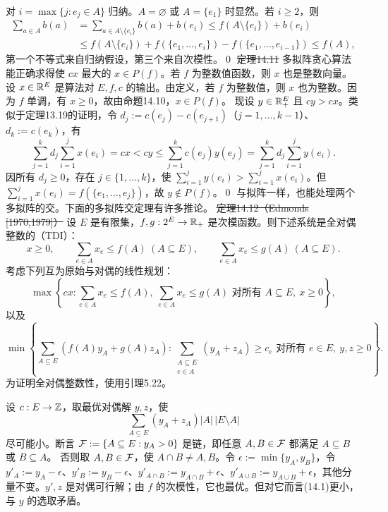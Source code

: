 \pr 对 $i=\max\{j:e_j\in A\}$ 归纳。$A=\varnothing$ 或 $A=\{e_1\}$ 时显然。若 $i\ge2$，则
\begin{align*}
\sum_{a\in A}b(a)&=\sum_{a\in A\setminus\{e_i\}}b(a)+b(e_i)\le f(A\setminus\{e_i\})+b(e_i)\\
&\le f(A\setminus\{e_i\})+f(\{e_1,\ldots,e_i\})-f(\{e_1,\ldots,e_{i-1}\})\le f(A),
\end{align*}
第一个不等式来自归纳假设，第三个来自次模性。\qed
\st{定理14.11} 多拟阵贪心算法能正确求得使 $cx$ 最大的 $x\in P(f)$。若 $f$ 为整数值函数，则 $x$ 也是整数向量。
\pr 设 $x\in\mathbb R^E$ 是算法对 $E,f,c$ 的输出。由定义，若 $f$ 为整数值，则 $x$ 也为整数。因为 $f$ 单调，有 $x\ge0$，故由命题14.10，$x\in P(f)$。
现设 $y\in\mathbb R_+^E$ 且 $cy>cx$。类似于定理13.19的证明，令 $d_j:=c(e_j)-c(e_{j+1})$（$j=1,\ldots,k-1$）、$d_k:=c(e_k)$，有
\[\sum_{j=1}^kd_j\sum_{i=1}^jx(e_i)=cx<cy\le\sum_{j=1}^kc(e_j)y(e_j)
=\sum_{j=1}^kd_j\sum_{i=1}^jy(e_i).\]
因所有 $d_j\ge0$，存在 $j\in\{1,\ldots,k\}$，使 $\sum_{i=1}^jy(e_i)>\sum_{i=1}^jx(e_i)$。但 $\sum_{i=1}^jx(e_i)=f(\{e_1,\ldots,e_j\})$，故 $y\notin P(f)$。\qed
与拟阵一样，也能处理两个多拟阵的交。下面的多拟阵交定理有许多推论。
\st{定理14.12（Edmonds [1970,1979]）} 设 $E$ 是有限集，$f,g:2^E\to\mathbb R_+$ 是次模函数。则下述系统是全对偶整数的（TDI）：
\[x\ge0,\qquad\sum_{e\in A}x_e\le f(A)\ (A\subseteq E),\qquad
\sum_{e\in A}x_e\le g(A)\ (A\subseteq E).\]
\pr 考虑下列互为原始与对偶的线性规划：
\[\max\left\{cx:\sum_{e\in A}x_e\le f(A),\ \sum_{e\in A}x_e\le g(A)\text{ 对所有 }A\subseteq E,\ x\ge0\right\},\]
以及
\[\min\left\{\sum_{A\subseteq E}(f(A)y_A+g(A)z_A):\sum_{\substack{A\subseteq E\\e\in A}}(y_A+z_A)\ge c_e\text{ 对所有 }e\in E,\ y,z\ge0\right\}.\]
为证明全对偶整数性，使用引理5.22。

设 $c:E\to\mathbb Z$，取最优对偶解 $y,z$，使
\[\sum_{A\subseteq E}(y_A+z_A)|A|\,|E\setminus A|\tag{14.1}\]
尽可能小。断言 $\mathcal F:=\{A\subseteq E:y_A>0\}$ 是链，即任意 $A,B\in\mathcal F$ 都满足 $A\subseteq B$ 或 $B\subseteq A$。
否则取 $A,B\in\mathcal F$，使 $A\cap B\ne A,B$。令 $\epsilon:=\min\{y_A,y_B\}$，令 $y'_A:=y_A-\epsilon$、$y'_B:=y_B-\epsilon$、$y'_{A\cap B}:=y_{A\cap B}+\epsilon$、$y'_{A\cup B}:=y_{A\cup B}+\epsilon$，其他分量不变。$y',z$ 是对偶可行解；由 $f$ 的次模性，它也最优。但对它而言(14.1)更小，与 $y$ 的选取矛盾。

